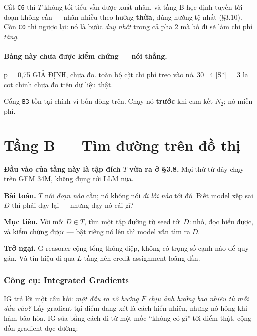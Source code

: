 \documentclass[11pt,a4paper]{article}
\begin{document}
Cắt \texttt{C6} thì $T$ không tối tiểu vẫn được xuất nhãn, và tầng B học định tuyến tới đoạn
không cần --- nhãn nhiễu theo hướng \textbf{thừa}, đúng hướng tệ nhất (\S3.10). Còn
\texttt{C0} thì ngược lại: nó là bước \emph{duy nhất} trong cả pha 2 mà bỏ đi sẽ làm chi phí
\emph{tăng}.

\paragraph{Bảng này chưa được kiểm chứng --- nói thẳng.}

\begin{dia}
p = 0,75              GIẢ ĐỊNH, chưa đo. toàn bộ cột chi phí treo vào nó.
30%
~4%
|S*| = 3 la cot chinh chưa đo trên dữ liệu thật.
\end{dia}

Cổng \texttt{B3} tồn tại chính vì bốn dòng trên. Chạy nó \textbf{trước} khi cam kết $N_2$; nó
miễn phí.

\section{Tầng B --- Tìm đường trên đồ thị}

\textbf{Đầu vào của tầng này là tập đích $T$ vừa ra ở \S3.8.} Mọi thứ từ đây chạy trên GFM
34M, không đụng tới LLM nữa.

\textbf{Bài toán.} $T$ nói \emph{đoạn nào} cần; nó không nói \emph{đi lối nào} tới đó.
Biết model xếp sai $D$ thì phải dạy lại --- nhưng dạy nó cái gì?

\textbf{Mục tiêu.} Với mỗi $D\in T$, tìm một tập đường từ seed tới $D$: nhỏ, đọc hiểu được,
và kiểm chứng được --- bật riêng nó lên thì model vẫn tìm ra $D$.

\textbf{Trở ngại.} G-reasoner cộng tổng thông điệp, không có trọng số cạnh nào để quy
gán. Và tín hiệu đi qua $L$ tầng nên credit assignment loãng dần.

\subsubsection*{Công cụ: Integrated Gradients}

IG trả lời một câu hỏi: \emph{một đầu ra vô hướng $F$ chịu ảnh hưởng bao nhiêu từ mỗi đầu
vào?} Lấy gradient tại điểm đang xét là cách hiển nhiên, nhưng nó hỏng khi hàm bão hòa. IG
sửa bằng cách đi từ một mốc ``không có gì'' tới điểm thật, cộng dồn gradient dọc đường:
\end{document}
